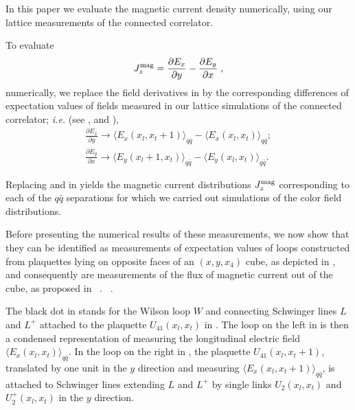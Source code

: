 \documentclass[pdftex,twocolumn,epjc3,envcountsect]{svjour3}
\newcommand{\Onlinecite}[1]{%
    \IfSubStr{#1}{,}{Refs}{Ref}.~\cite{#1}%
}
\begin{document}
In this paper we evaluate the magnetic current density  numerically, using our lattice measurements of the connected correlator.

To evaluate
\begin {equation}
J^{\rm mag}_z = \frac{\partial E_x}{\partial y} - \frac{\partial E_y}{\partial x} \;,
\label{Jz}
\end{equation}
numerically, we replace the field derivatives in  by the corresponding differences of expectation values of fields measured in our lattice simulations of the connected correlator; {\em i.e.} (see ,  and ), 
\begin {align}
&\frac{\partial E_x}{\partial y} \rightarrow \langle E_x (x_l, x_t +1)\rangle_{q \bar{q}} -  \langle E_x (x_l, x_t)\rangle_{q \bar{q}} ;&
\label{discretederivs1}
\\
&\frac{\partial E_y}{\partial x} \rightarrow \langle E_y (x_l +1, x_t)\rangle_{q \bar{q}} -  \langle E_y (x_l, x_t)\rangle_{q \bar{q}}.&
\label{discretederivs2}
\end{align}

Replacing  and  in  yields the magnetic current distributions $J^{\rm mag}_z$ corresponding to each of the $q \bar{q}$ separations for which we carried out simulations of the color field distributions. 

Before presenting the numerical results of these measurements, we now show that they can be identified as measurements of expectation values of loops constructed from plaquettes lying on opposite faces of an $(x, y, x_4)$ cube, as depicted in , and consequently are measurements of the flux of  magnetic current out of the cube, as proposed in~\Onlinecite{Skala:1996ar}.

The black dot in  stands for the Wilson loop $W$ and connecting Schwinger lines $L$ and $L^+$ attached to the plaquette $U_{41} (x_l, x_t)$ in . The loop on the left in  is then a condensed representation of  measuring the longitudinal electric field  $\langle E_x (x_l, x_t)\rangle_{q \bar{q}}$.
In the loop on the right in , the plaquette  $U_{41} (x_l, x_t +1)$, translated by one unit in the $y$ direction and measuring $\langle E_x (x_l, x_t+1)\rangle_{q \bar{q}}$, is attached to Schwinger lines extending  $L$ and $L^+$ by single links $U_2 (x_l, x_t)$ and $U_2^+ (x_l, x_t)$ in the $y$ direction.
 
\end{document}
